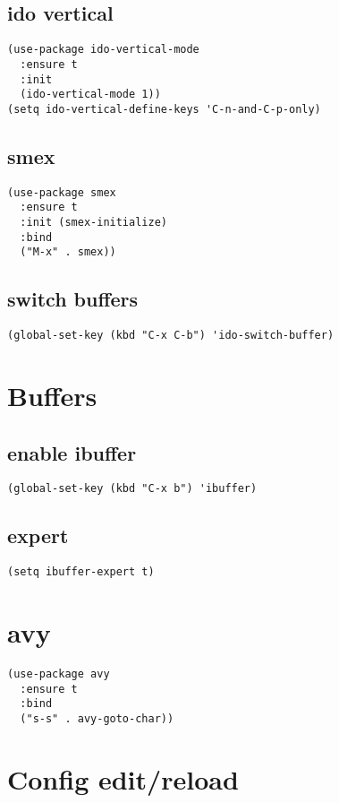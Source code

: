 \documentclass[11pt]{article}
\begin{document}
\subsection{ido vertical}
\label{sec-6-2}
\begin{verbatim}
(use-package ido-vertical-mode
  :ensure t
  :init
  (ido-vertical-mode 1))
(setq ido-vertical-define-keys 'C-n-and-C-p-only)
\end{verbatim}
\subsection{smex}
\label{sec-6-3}
\begin{verbatim}
(use-package smex
  :ensure t
  :init (smex-initialize)
  :bind
  ("M-x" . smex))
\end{verbatim}
\subsection{switch buffers}
\label{sec-6-4}
\begin{verbatim}
(global-set-key (kbd "C-x C-b") 'ido-switch-buffer)
\end{verbatim}
\section{Buffers}
\label{sec-7}
\subsection{enable ibuffer}
\label{sec-7-1}
\begin{verbatim}
(global-set-key (kbd "C-x b") 'ibuffer)
\end{verbatim}
\subsection{expert}
\label{sec-7-2}
\begin{verbatim}
(setq ibuffer-expert t)
\end{verbatim}
\section{avy}
\label{sec-8}
\begin{verbatim}
(use-package avy
  :ensure t
  :bind
  ("s-s" . avy-goto-char))
\end{verbatim}
\section{Config edit/reload}
\label{sec-9}
\end{document}
